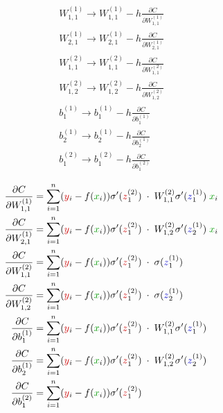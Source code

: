 \documentclass[pdflatex]{article}
\begin{document}
          \begin{align}
W^{(1)}_{1,1}  \rightarrow W^{(1)}_{1,1} - h  \frac{\partial C}{\partial W^{(1)}_{1,1}} \\
 W^{(1)}_{2,1} \rightarrow W^{(1)}_{2,1} - h   \frac{\partial C}{\partial W^{(1)}_{2,1}} \\
W^{(2)}_{1,1} \rightarrow W^{(2)}_{1,1} - h            \frac{\partial C}{\partial W^{(2)}_{1,1}} \\
 W^{(2)}_{1,2} \rightarrow  W^{(2)}_{1,2} - h             \frac{\partial C}{\partial W^{(2)}_{1,2}} \\
b^{(1)}_1 \rightarrow b^{(1)}_1  - h             \frac{\partial C}{\partial b^{(1)}_1} \\
b^{(1)}_2 \rightarrow b^{(1)}_2 - h   \frac{\partial C}{\partial b^{(1)}_2} \\
b^{(2)}_1 \rightarrow  b^{(2)}_1 - h \frac{\partial C}{\partial b^{(2)}_1} 
           \end{align}


    \begin{align}
\frac{\partial C}{\partial W^{(1)}_{1,1}} & =\sum_{i=1}^{n}  (\yr_i-f(\xg_i))
            \sigma'(\zr^{(2)}_1) \;\cdot\; W^{(2)}_{1,1}\sigma'(\zb^{(1)}_1)
                                  \; \xg_i \\
            \frac{\partial C}{\partial W^{(1)}_{2,1}} & = \sum_{i=1}^{n}  (\yr_i-f(\xg_i))
            \sigma'(\zr^{(2)}_1) \; \cdot \;W^{(2)}_{1,2}\sigma'(\zb^{(1)}_2)
                                 \;  \xg_i \\
           \frac{\partial C}{\partial W^{(2)}_{1,1}} & = \sum_{i=1}^{n}  (\yr_i-f(\xg_i))
            \sigma'(\zr^{(2)}_1)\;\cdot\;\sigma(\zb^{(1)}_1\color{black})\\
\frac{\partial C}{\partial W^{(2)}_{1,2}} & = \sum_{i=1}^{n}  (\yr_i-f(\xg_i))
            \sigma'(\zr^{(2)}_1) \;\cdot\; \sigma(\zb^{(1)}_2\color{black})\\
 \frac{\partial C}{\partial b^{(1)}_1} & = \sum_{i=1}^{n}  (\yr_i-f(\xg_i))
            \sigma'(\zr^{(2)}_1) \;\cdot\;
                                         W^{(2)}_{1,1}\sigma'(\zb^{(1)}_1)
            \\                             \frac{\partial C}{\partial
            b^{(1)}_2} & = \sum_{i=1}^{n}  (\yr_i-f(\xg_i))
            \sigma'(\zr^{(2)}_1) \;\cdot\; W^{(2)}_{1,2}\sigma'(\zb^{(1)}_2)       \\                          \frac{\partial C}{\partial b^{(2)}_1} & = \sum_{i=1}^{n}  (\yr_i-f(\xg_i))
            \sigma'(\zr^{(2)}_1) 
           \end{align}







           


            
 
\end{document}
